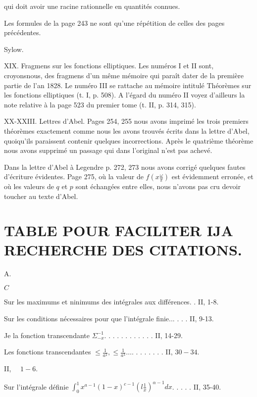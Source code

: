 \documentclass{article}
\begin{document}
qui doit avoir une racine rationnelle en quantités connues.

Les formules de la page 243 ne sont qu'une répétition de celles des pages précédentes.

Sylow.

XIX. Fragmens sur les fonctions elliptiques. Les numéros I et II sont, croyonsnous, des fragmens d'un même mémoire qui paraît dater de la première partie de l'an 1828. Le numéro III se rattache au mémoire intitulé Théorèmes sur les fonctions elliptiques (t. I, p. 508). A l'égard du numéro II voyez d'ailleurs la note relative à la page 523 du premier tome (t. II, p. 314, 315).

XX-XXIII. Lettres d'Abel. Pages 254, 255 nous avons imprimé les trois premiers théorèmes exactement comme nous les avons trouvés écrits dans la lettre d'Abel, quoiqu'ils paraissent contenir quelques incorrections. Après le quatrième théorème nous avons supprimé un passage qui dans l'original n'est pas achevé.

Dans la lettre d'Abel à Legendre p. 272, 273 nous avons corrigé quelques fautes d'écriture évidentes. Page 275, où la valeur de \(f\left(x \frac{\omega}{\pi}\right)\) est évidemment erronée, et où les valeurs de \(q\) et \(p\) sont échangées entre elles, nous n'avons pas cru devoir toucher au texte d'Abel.

\section*{TABLE POUR FACILITER IJA RECHERCHE DES CITATIONS.}
A.

\(C\)

Sur les maximums et ninimums des intégrales aux différences. . II, 1-8.

Sur les conditions nécessaires pour que l'intégrale finie... . . . II, 9-13.

Je la fonction transcendante \(\Sigma_{-x}^{-1}\). . . . . . . . . . . . II, 14-29.

Les fonctions transcendantes \(\leq \frac{1}{a^{2}}, \leq \frac{1}{a^{3}} \ldots\). . . . . . . . II, \(30-34\).

II, \(\quad 1-6\).

Sur l'intégrale définie \(\int_{0}^{1} x^{a-1}(1-x)^{c-1}\left(l \frac{1}{x}\right)^{\alpha-1} d x\). . . . . II, 35-40.
\end{document}
